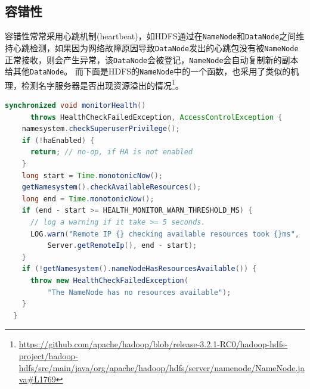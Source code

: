 \documentclass[logo,reportComp]{thesis}
\begin{document}
\subsection{容错性}
容错性常常采用心跳机制(heartbeat)，如HDFS通过在\verb'NameNode'和\verb'DataNode'之间维持心跳检测，如果因为网络故障原因导致\verb'DataNode'发出的心跳包没有被\verb'NameNode'正常接收，则会产生异常，该\verb'DataNode'会被登记，\verb'NameNode'会自动复制新的副本给其他\verb'DataNode'。
而下面是HDFS的\verb'NameNode'中的一个函数，也采用了类似的机理，检测名字服务器是否出现资源溢出的情况\footnote{\url{https://github.com/apache/hadoop/blob/release-3.2.1-RC0/hadoop-hdfs-project/hadoop-hdfs/src/main/java/org/apache/hadoop/hdfs/server/namenode/NameNode.java\#L1769}}。
\begin{lstlisting}[language=java]
  synchronized void monitorHealth() 
      throws HealthCheckFailedException, AccessControlException {
    namesystem.checkSuperuserPrivilege();
    if (!haEnabled) {
      return; // no-op, if HA is not enabled
    }
    long start = Time.monotonicNow();
    getNamesystem().checkAvailableResources();
    long end = Time.monotonicNow();
    if (end - start >= HEALTH_MONITOR_WARN_THRESHOLD_MS) {
      // log a warning if it take >= 5 seconds.
      LOG.warn("Remote IP {} checking available resources took {}ms",
          Server.getRemoteIp(), end - start);
    }
    if (!getNamesystem().nameNodeHasResourcesAvailable()) {
      throw new HealthCheckFailedException(
          "The NameNode has no resources available");
    }
  }
\end{lstlisting}
\end{document}
